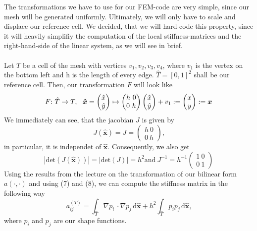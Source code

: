 \documentclass[a4paper,12pt]{report}
\begin{document}
The transformations we have to use for our FEM-code are very simple, since our mesh will be generated uniformly. Ultimately, we will only have to scale and displace our reference cell. We decided, that we will hard-code this property, since it will heavily simplifiy the computation of the local stiffness-matrices and the right-hand-side of the linear system, as we will see in brief.
\\ \\
Let $T$ be a cell of the mesh with vertices $v_1,v_2,v_3,v_4$, where $v_1$ is the vertex on the bottom left and h is the length of every edge. $\hat T = [0,1]^2$ shall be our reference cell. Then, our transformation $F$ will look like 
\[F \smash : \  \hat T \rightarrow T, \ \ \bm{\hat x}=\begin{pmatrix}\hat x \\ \hat y \end{pmatrix} \mapsto \begin{pmatrix}h \ 0 \\ 0 \ h\end{pmatrix} \begin{pmatrix}\hat x \\ \hat y \end{pmatrix} + v_1 := \begin{pmatrix}x\\y\end{pmatrix} := \bm{x}\]
We immediately can see, that the jacobian $J$ is given by
\begin{equation}
J(\bm{\hat x})=J=\begin{pmatrix}h \ 0\\0 \ h\end{pmatrix}\mbox{,}
\end{equation}
in particular, it is independet of $\bm{\hat x}$. Consequently, we also get
\begin{equation}
|\mbox{det}(J(\bm{\hat x}))|=|\mbox{det}(J)|=h^2\mbox{and} \ J^{-1}=h^{-1}\begin{pmatrix}1 \ 0 \\ 0 \ 1\end{pmatrix}
\end{equation}
Using the results from the lecture on the transformation of our bilinear form $a(\cdotp, \cdot)$ and using (7) and (8), we can compute the stiffness matrix in the following way
\[a^{(T)}_{ij} = \int_{\hat T}\nabla p_i \,\cdotp \nabla p_j\,\mbox{d}\bm{\hat x} + h^2\int_{\hat T}p_i p_j\,\mbox{d}\bm{\hat x}\mbox{,}\]
where $p_i$ and $p_j$ are our shape functions.\\ \\
\end{document}
